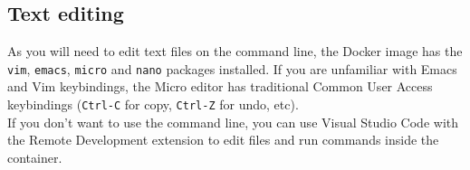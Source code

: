 \subsection{Text editing}
As you will need to edit text files on the command line,
the Docker image has the \texttt{vim},
\texttt{emacs}, \texttt{micro} and \texttt{nano} packages installed.
If you are unfamiliar with Emacs and Vim keybindings, the Micro editor
has traditional Common User Access keybindings (\texttt{Ctrl-C} for copy,
\texttt{Ctrl-Z} for undo, etc).\\

If you don't want to use the command line, you can use Visual Studio Code with
the Remote Development extension to edit files and run commands inside the
container.